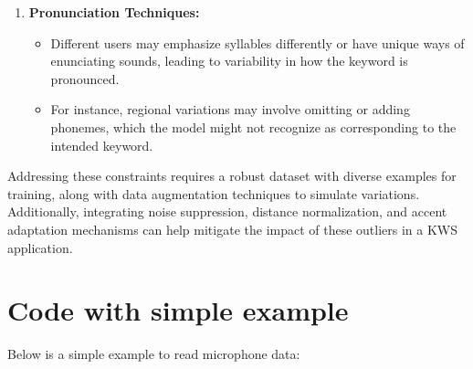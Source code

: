 \begin{enumerate}
	\item \textbf{Pronunciation Techniques:}
	\begin{itemize}
		\item Different users may emphasize syllables differently or have unique ways of enunciating sounds, leading to variability in how the keyword is pronounced.
		\item For instance, regional variations may involve omitting or adding phonemes, which the model might not recognize as corresponding to the intended keyword.
	\end{itemize}
\end{enumerate}
Addressing these constraints requires a robust dataset with diverse examples for training, along with data augmentation techniques to simulate variations. Additionally, integrating noise suppression, distance normalization, and accent adaptation mechanisms can help mitigate the impact of these outliers in a KWS application.

\section{Code with simple example}

Below is a simple example to read microphone data:


